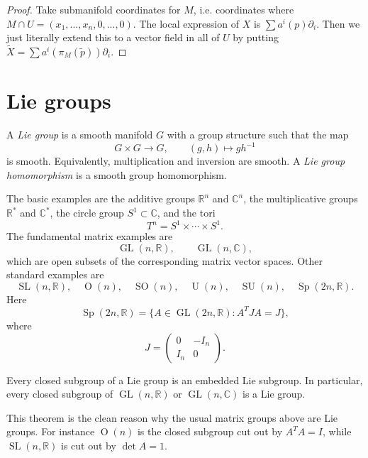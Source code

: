 \begin{proof}
Take submanifold coordinates for $M$,
i.e. coordinates where $M\cap U
=(x_1,...,x_n,0,...,0)$.
The local expression of $X$ is
$\sum a^i(p)\partial_i$.
Then we just literally extend this to a
vector
field in all of $U$ by putting
$\tilde{X}=\sum
a^i(\pi_M(\tilde{p}))\partial_i$.
\end{proof}

\section{Lie groups}
\label{section-lie-groups}

\begin{definition}
\label{definition-lie-group}
A {\it Lie group} is a smooth manifold $G$
with a group structure such that the map
$$
G\times G\to G,\qquad
(g,h)\mapsto gh^{-1}
$$
is smooth.
Equivalently, multiplication and inversion
are smooth.
A {\it Lie group homomorphism} is a smooth
group homomorphism.
\end{definition}

\medskip\noindent
The basic examples are the additive groups
$\mathbb{R}^n$ and $\mathbb{C}^n$, the
multiplicative groups $\mathbb{R}^*$ and
$\mathbb{C}^*$, the circle group
$S^1\subset\mathbb{C}$, and the tori
$$
T^n=S^1\times\cdots\times S^1.
$$
The fundamental matrix examples are
$$
\operatorname{GL}(n,\mathbb{R}),\qquad
\operatorname{GL}(n,\mathbb{C}),
$$
which are open subsets of the corresponding
matrix vector spaces. Other standard examples
are
$$
\operatorname{SL}(n,\mathbb{R}),\quad
\operatorname{O}(n),\quad
\operatorname{SO}(n),\quad
\operatorname{U}(n),\quad
\operatorname{SU}(n),\quad
\operatorname{Sp}(2n,\mathbb{R}).
$$
Here
$$
\operatorname{Sp}(2n,\mathbb{R})=
\{A\in \operatorname{GL}(2n,\mathbb{R}):
A^TJA=J\},
$$
where
$$
J=\begin{pmatrix}0&-I_n\\ I_n&0\end{pmatrix}.
$$

\begin{theorem}
\label{theorem-closed-subgroup}
Every closed subgroup of a Lie group is an
embedded Lie subgroup.
In particular, every closed subgroup of
$\operatorname{GL}(n,\mathbb{R})$ or
$\operatorname{GL}(n,\mathbb{C})$ is a Lie
group.
\end{theorem}

\medskip\noindent
This theorem is the clean reason why the
usual matrix groups above are Lie groups.
For instance $\operatorname{O}(n)$ is the
closed subgroup cut out by $A^TA=I$, while
$\operatorname{SL}(n,\mathbb{R})$ is cut out
by $\det A=1$.

